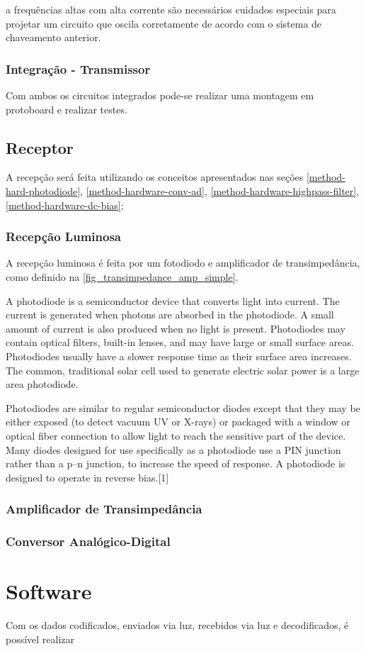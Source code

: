 		a frequências altas com alta corrente são necessários cuidados especiais para projetar um circuito que oscila corretamente de acordo com o sistema de chaveamento anterior.
		
	\subsubsection{Integração - Transmissor}
		
		Com ambos os circuitos integrados pode-se realizar uma montagem em protoboard e realizar testes.
		
	\subsection{Receptor}
		
		A recepção será feita utilizando os conceitos apresentados nas seções \ref{method-hard-photodiode}, \ref{method-hardware-conv-ad}, \ref{method-hardware-highpass-filter}, \ref{method-hardware-dc-bias};
		
	\subsubsection{Recepção Luminosa}
		
		A recepção luminosa é feita por um fotodiodo e amplificador de transimpedância, como definido na \autoref{fig_transimpedance_amp_simple}. 
		
		A photodiode is a semiconductor device that converts light into current. The current is generated when photons are absorbed in the photodiode. A small amount of current is also produced when no light is present. Photodiodes may contain optical filters, built-in lenses, and may have large or small surface areas. Photodiodes usually have a slower response time as their surface area increases. The common, traditional solar cell used to generate electric solar power is a large area photodiode.
		
		Photodiodes are similar to regular semiconductor diodes except that they may be either exposed (to detect vacuum UV or X-rays) or packaged with a window or optical fiber connection to allow light to reach the sensitive part of the device. Many diodes designed for use specifically as a photodiode use a PIN junction rather than a p–n junction, to increase the speed of response. A photodiode is designed to operate in reverse bias.[1]

		
		
	\subsubsection{Amplificador de Transimpedância}
	
	\subsubsection{Conversor Analógico-Digital}
	
	\section{Software}
		Com os dados codificados, enviados via luz, recebidos via luz e decodificados, é possível realizar 
